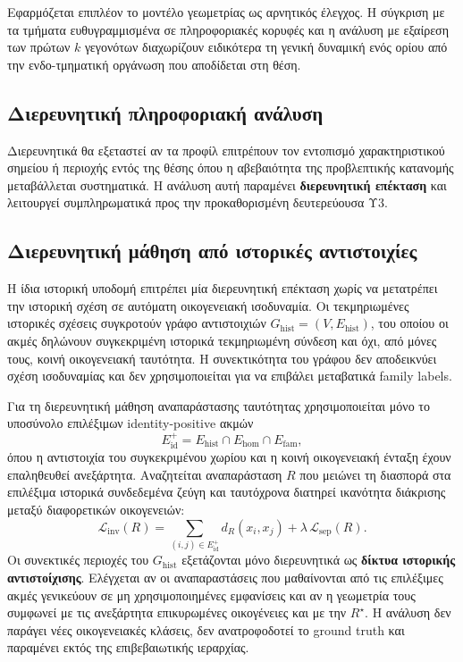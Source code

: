 \documentclass[11pt,a4paper]{article}
\begin{document}
Εφαρμόζεται επιπλέον το μοντέλο γεωμετρίας ως αρνητικός έλεγχος. Η σύγκριση με τα τμήματα ευθυγραμμισμένα σε πληροφοριακές κορυφές και η ανάλυση με εξαίρεση των πρώτων \(k\) γεγονότων διαχωρίζουν ειδικότερα τη γενική δυναμική ενός ορίου από την ενδο-τμηματική οργάνωση που αποδίδεται στη θέση.

\subsection{Διερευνητική πληροφοριακή ανάλυση}\label{app:robust-info}

Διερευνητικά θα εξεταστεί αν τα προφίλ επιτρέπουν τον εντοπισμό χαρακτηριστικού σημείου ή περιοχής εντός της θέσης όπου η αβεβαιότητα της προβλεπτικής κατανομής μεταβάλλεται συστηματικά. Η ανάλυση αυτή παραμένει \textbf{διερευνητική επέκταση} και λειτουργεί συμπληρωματικά προς την προκαθορισμένη δευτερεύουσα Υ3.

\subsection{Διερευνητική μάθηση από ιστορικές αντιστοιχίες}\label{app:robust-reverse}

Η ίδια ιστορική υποδομή επιτρέπει μία διερευνητική επέκταση χωρίς να μετατρέπει την ιστορική σχέση σε αυτόματη οικογενειακή ισοδυναμία. Οι τεκμηριωμένες ιστορικές σχέσεις συγκροτούν γράφο αντιστοιχιών $G_{\mathrm{hist}}=(V,E_{\mathrm{hist}})$, του οποίου οι ακμές δηλώνουν συγκεκριμένη ιστορικά τεκμηριωμένη σύνδεση και όχι, από μόνες τους, κοινή οικογενειακή ταυτότητα. Η συνεκτικότητα του γράφου δεν αποδεικνύει σχέση ισοδυναμίας και δεν χρησιμοποιείται για να επιβάλει μεταβατικά family labels.

Για τη διερευνητική μάθηση αναπαράστασης ταυτότητας χρησιμοποιείται μόνο το υποσύνολο επιλέξιμων identity-positive ακμών
\[
E_{\mathrm{id}}^{+}=E_{\mathrm{hist}}\cap E_{\mathrm{hom}}\cap E_{\mathrm{fam}},
\]
όπου η αντιστοιχία του συγκεκριμένου χωρίου και η κοινή οικογενειακή ένταξη έχουν επαληθευθεί ανεξάρτητα. Αναζητείται αναπαράσταση $R$ που μειώνει τη διασπορά στα επιλέξιμα ιστορικά συνδεδεμένα ζεύγη και ταυτόχρονα διατηρεί ικανότητα διάκρισης μεταξύ διαφορετικών οικογενειών:
\[
\mathcal{L}_{\mathrm{inv}}(R)=
\sum_{(i,j)\in E_{\mathrm{id}}^{+}} d_R(x_i,x_j)
+\lambda\,\mathcal{L}_{\mathrm{sep}}(R).
\]
Οι συνεκτικές περιοχές του $G_{\mathrm{hist}}$ εξετάζονται μόνο διερευνητικά ως \textbf{δίκτυα ιστορικής αντιστοίχισης}. Ελέγχεται αν οι αναπαραστάσεις που μαθαίνονται από τις επιλέξιμες ακμές γενικεύουν σε μη χρησιμοποιημένες εμφανίσεις και αν η γεωμετρία τους συμφωνεί με τις ανεξάρτητα επικυρωμένες οικογένειες και με την $R^\star$. Η ανάλυση δεν παράγει νέες οικογενειακές κλάσεις, δεν ανατροφοδοτεί το ground truth και παραμένει εκτός της επιβεβαιωτικής ιεραρχίας.
\end{document}

